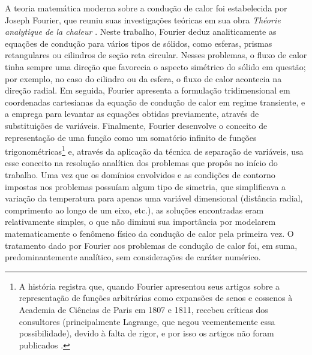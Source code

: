 A teoria matemática moderna sobre a condução de calor foi estabelecida por Joseph Fourier, que reuniu suas investigações teóricas em sua obra
\textit{Théorie analytique de la chaleur} \citep{livro_fourier, artigo_langer}. Neste trabalho, Fourier deduz analiticamente as equações de condução para vários
tipos de sólidos, como esferas, prismas retangulares ou cilindros de seção reta circular. Nesses problemas, o fluxo de calor tinha
sempre uma direção que favorecia o aspecto simétrico do sólido em questão; por exemplo, no caso do cilindro ou da esfera, o fluxo
de calor acontecia na direção radial. Em seguida, Fourier apresenta a formulação tridimensional em coordenadas cartesianas da equação
de condução de calor em regime transiente, e a emprega para levantar as equações obtidas previamente, através de substituições de
variáveis. Finalmente, Fourier desenvolve o conceito de representação de uma função como um somatório infinito de funções
trigonométricas\footnote{A história registra que, quando Fourier apresentou seus artigos sobre a representação de funções arbitrárias
como expansões de senos e cossenos à Academia de Ciências de Paris em 1807 e 1811, recebeu críticas dos consultores (principalmente Lagrange,
que negou veementemente essa possibilidade), devido à falta de rigor, e por isso os artigos não foram publicados \citep{livro_agarwal}.} e, através da aplicação
da técnica de separação de variáveis, usa esse conceito na resolução analítica dos problemas que propôs no início do trabalho. Uma vez que os domínios envolvidos e as
condições de contorno impostas nos problemas possuíam algum tipo de simetria, que simplificava a variação da temperatura para apenas uma
variável dimensional (distância radial, comprimento ao longo de um eixo, etc.), as soluções encontradas eram relativamente simples, o que não
diminui sua importância por modelarem matematicamente o fenômeno físico da condução de calor pela primeira vez. O tratamento
dado por Fourier aos problemas de condução de calor foi, em suma, predominantemente analítico, sem considerações de caráter numérico.

